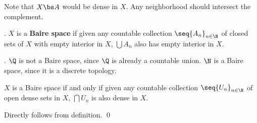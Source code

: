 \rmk Note that \(X \bs A\) would be dense in \(X\). Any neighborhood should intersect the complement.

.  \(X\) is a \textbf{Baire space} if given any countable collection \(\seq{A_n}_{n \in \N}\) of closed sets of \(X\) with empty interior in \(X\), \(\bigcup A_n\) also has empty interior in \(X\).

\ex. \(\Q\) is not a Baire space, since \(\Q\) is already a countable union. \(\N\) is a Baire space, since it is a discrete topology.

 \(X\) is a Baire space if and only if given any countable collection \(\seq{U_n}_{n \in \N}\) of open dense sets in \(X\), \(\bigcap U_n\) is also dense in \(X\).

\pf Directly follows from definition. \qed

\pagebreak
